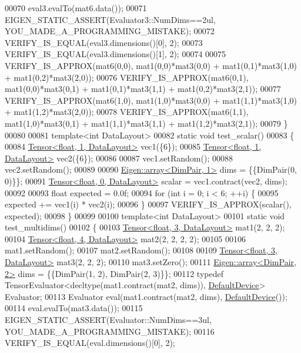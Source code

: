 \begin{DoxyCode}
00070   eval3.evalTo(mat6.data());
00071   EIGEN\_STATIC\_ASSERT(Evaluator3::NumDims==2ul, YOU\_MADE\_A\_PROGRAMMING\_MISTAKE);
00072   VERIFY\_IS\_EQUAL(eval3.dimensions()[0], 2);
00073   VERIFY\_IS\_EQUAL(eval3.dimensions()[1], 2);
00074 
00075   VERIFY\_IS\_APPROX(mat6(0,0), mat1(0,0)*mat3(0,0) + mat1(0,1)*mat3(1,0) + mat1(0,2)*mat3(2,0));
00076   VERIFY\_IS\_APPROX(mat6(0,1), mat1(0,0)*mat3(0,1) + mat1(0,1)*mat3(1,1) + mat1(0,2)*mat3(2,1));
00077   VERIFY\_IS\_APPROX(mat6(1,0), mat1(1,0)*mat3(0,0) + mat1(1,1)*mat3(1,0) + mat1(1,2)*mat3(2,0));
00078   VERIFY\_IS\_APPROX(mat6(1,1), mat1(1,0)*mat3(0,1) + mat1(1,1)*mat3(1,1) + mat1(1,2)*mat3(2,1));
00079 \}
00080 
00081 \textcolor{keyword}{template}<\textcolor{keywordtype}{int} DataLayout>
00082 \textcolor{keyword}{static} \textcolor{keywordtype}{void} test\_scalar()
00083 \{
00084   \hyperlink{class_eigen_1_1_tensor}{Tensor<float, 1, DataLayout>} vec1(\{6\});
00085   \hyperlink{class_eigen_1_1_tensor}{Tensor<float, 1, DataLayout>} vec2(\{6\});
00086 
00087   vec1.setRandom();
00088   vec2.setRandom();
00089 
00090   \hyperlink{class_eigen_1_1array}{Eigen::array<DimPair, 1>} dims = \{\{DimPair(0, 0)\}\};
00091   \hyperlink{class_eigen_1_1_tensor}{Tensor<float, 0, DataLayout>} scalar = vec1.contract(vec2, dims);
00092 
00093   \textcolor{keywordtype}{float} expected = 0.0f;
00094   \textcolor{keywordflow}{for} (\textcolor{keywordtype}{int} i = 0; i < 6; ++i) \{
00095     expected += vec1(i) * vec2(i);
00096   \}
00097   VERIFY\_IS\_APPROX(scalar(), expected);
00098 \}
00099 
00100 \textcolor{keyword}{template}<\textcolor{keywordtype}{int} DataLayout>
00101 \textcolor{keyword}{static} \textcolor{keywordtype}{void} test\_multidims()
00102 \{
00103   \hyperlink{class_eigen_1_1_tensor}{Tensor<float, 3, DataLayout>} mat1(2, 2, 2);
00104   \hyperlink{class_eigen_1_1_tensor}{Tensor<float, 4, DataLayout>} mat2(2, 2, 2, 2);
00105 
00106   mat1.setRandom();
00107   mat2.setRandom();
00108 
00109   \hyperlink{class_eigen_1_1_tensor}{Tensor<float, 3, DataLayout>} mat3(2, 2, 2);
00110   mat3.setZero();
00111   \hyperlink{class_eigen_1_1array}{Eigen::array<DimPair, 2>} dims = \{\{DimPair(1, 2), DimPair(2, 3)\}\};
00112   \textcolor{keyword}{typedef} TensorEvaluator<decltype(mat1.contract(mat2, dims)), \hyperlink{struct_eigen_1_1_default_device}{DefaultDevice}> Evaluator;
00113   Evaluator eval(mat1.contract(mat2, dims), \hyperlink{struct_eigen_1_1_default_device}{DefaultDevice}());
00114   eval.evalTo(mat3.data());
00115   EIGEN\_STATIC\_ASSERT(Evaluator::NumDims==3ul, YOU\_MADE\_A\_PROGRAMMING\_MISTAKE);
00116   VERIFY\_IS\_EQUAL(eval.dimensions()[0], 2);

\end{DoxyCode}
